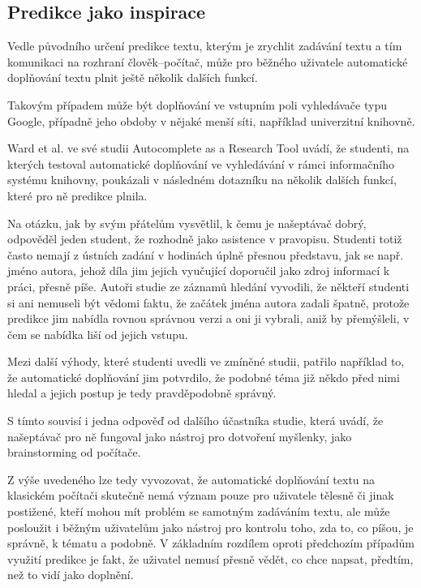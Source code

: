 \documentclass[a4paper,11pt]{article}
\begin{document}
\subsection{Predikce jako inspirace}

Vedle původního určení predikce textu, kterým je zrychlit zadávání textu a tím komunikaci na rozhraní člověk--počítač, může pro běžného uživatele automatické doplňování textu plnit ještě několik dalších funkcí.

Takovým případem může být doplňování ve vstupním poli vyhledávače typu Google, případně jeho obdoby v nějaké menší síti, například univerzitní knihovně. \parencite{google2015}

Ward et al. ve své studii Autocomplete as a Research Tool uvádí, že studenti, na kterých testoval automatické doplňování ve vyhledávání v rámci informačního systému knihovny, poukázali v následném dotazníku na několik dalších funkcí, které pro ně predikce plnila.

Na otázku, jak by svým přátelům vysvětlil, k čemu je našeptávač dobrý, odpověděl jeden student, že rozhodně jako asistence v pravopisu. Studenti totiž často nemají z ústních zadání v hodinách úplně přesnou představu, jak se např. jméno autora, jehož díla jim jejich vyučující doporučil jako zdroj informací k práci, přesně píše. Autoři studie ze záznamů hledání vyvodili, že někteří studenti si ani nemuseli být vědomi faktu, že začátek jména autora zadali špatně, protože predikce jim nabídla rovnou správnou verzi a oni ji vybrali, aniž by přemýšleli, v čem se nabídka liší od jejich vstupu. 

Mezi další výhody, které studenti uvedli ve zmíněné studii, patřilo například to, že automatické doplňování jim potvrdilo, že podobné téma již někdo před nimi hledal a jejich postup je tedy pravděpodobně správný. 

S tímto souvisí i jedna odpověď od dalšího účastníka studie, která uvádí, že našeptávač pro ně fungoval jako nástroj pro dotvoření myšlenky, jako brainstorming od počítače. 

Z výše uvedeného lze tedy vyvozovat, že automatické doplňování textu na klasickém počítači skutečně nemá význam pouze pro uživatele tělesně či jinak postižené, kteří mohou mít problém se samotným zadáváním textu, ale může posloužit i běžným uživatelům jako nástroj pro kontrolu toho, zda to, co píšou, je správně, k tématu a podobně. V základním rozdílem oproti předchozím případům využití predikce je fakt, že uživatel nemusí přesně vědět, co chce napsat, předtím, než to vidí jako doplnění. \parencite{ward2012autocomplete}
\end{document}
